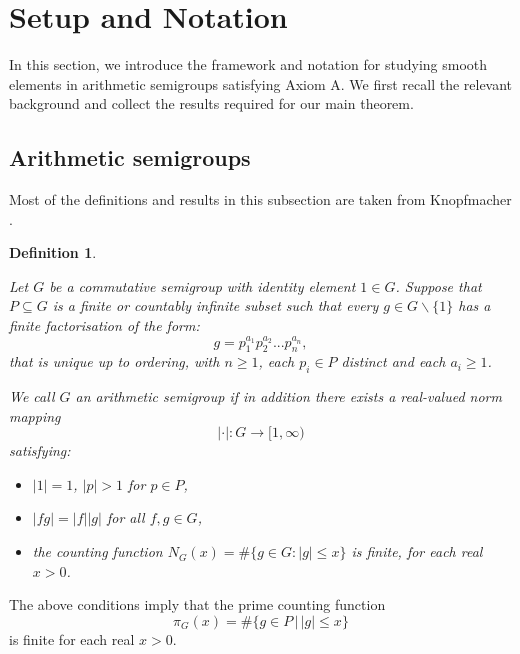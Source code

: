 \documentclass[a4paper]{amsart}
\newtheorem{definition}{Definition}[section]
\begin{document}
 \section{Setup and Notation}\label{sec:setup}
In this section, we introduce the framework and notation for studying smooth elements in arithmetic semigroups satisfying Axiom A. We first recall the relevant background and collect the results required for our main theorem.
\subsection{Arithmetic semigroups}

Most of the definitions and results in this subsection are taken from Knopfmacher \cite{knopfmacher2015abstract}.

\begin{definition}\label{def:arithmetic-semigroup}

Let $G$ be a commutative semigroup with identity element $1\in G$. Suppose that $P\subseteq G$ is a finite or countably infinite subset such that every $g\in G\backslash\{1\}$ has a finite factorisation of the form: \[g = p_1^{a_1}p_2^{a_2}...p_n^{a_n},\] that is unique up to ordering, with $n\geq 1$, each $p_i\in P$ distinct and each $a_i\geq 1$.

        We call $G$ an arithmetic semigroup if in addition there exists a real-valued \textit{norm mapping}
\[
|\cdot|:G\longrightarrow[1,\infty)
\]
satisfying:

\begin{itemize}
    \item[(i)] $|1| = 1$, $|p| > 1$ for $p \in P$,
    \item[(ii)] $|fg| = |f| |g|$ for all $f,g \in G$,
    \item[(iii)] the counting function $N_G(x) =\#\{g\in G:|g|\le x\}$ is finite, for each real $x > 0$.
\end{itemize}
\end{definition}

The above conditions imply that the prime counting function \[\pi_G(x) = \#\{g\in P\,|\, |g|\le x\}\] is finite for each real $x>0$.\\
\end{document}
